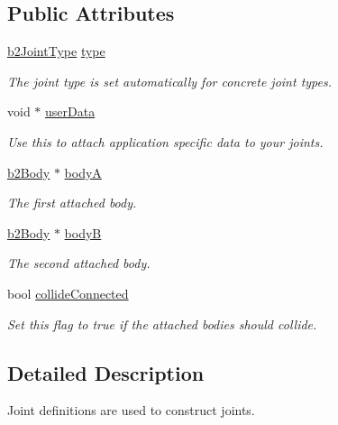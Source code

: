 \subsection*{Public Attributes}
\begin{DoxyCompactItemize}
\item 
\mbox{\hyperlink{b2_joint_8h_a0bb202d8a286c888a11985b07b2272ab}{b2\+Joint\+Type}} \mbox{\hyperlink{structb2_joint_def_a470f2879b24adb05facbd49f338856fb}{type}}
\begin{DoxyCompactList}\small\item\em The joint type is set automatically for concrete joint types. \end{DoxyCompactList}\item 
void $\ast$ \mbox{\hyperlink{structb2_joint_def_a07eb150daaaa52fc09c3bcf402b295fe}{user\+Data}}
\begin{DoxyCompactList}\small\item\em Use this to attach application specific data to your joints. \end{DoxyCompactList}\item 
\mbox{\hyperlink{classb2_body}{b2\+Body}} $\ast$ \mbox{\hyperlink{structb2_joint_def_a8cd54c93da396be75a9788f2c6897f05}{bodyA}}
\begin{DoxyCompactList}\small\item\em The first attached body. \end{DoxyCompactList}\item 
\mbox{\hyperlink{classb2_body}{b2\+Body}} $\ast$ \mbox{\hyperlink{structb2_joint_def_aa4f4dee2fbcd12187b19506b60e68e3d}{bodyB}}
\begin{DoxyCompactList}\small\item\em The second attached body. \end{DoxyCompactList}\item 
bool \mbox{\hyperlink{structb2_joint_def_aef099a1f89b64e230173b6016848ea9b}{collide\+Connected}}
\begin{DoxyCompactList}\small\item\em Set this flag to true if the attached bodies should collide. \end{DoxyCompactList}\end{DoxyCompactItemize}


\subsection{Detailed Description}
Joint definitions are used to construct joints. 

